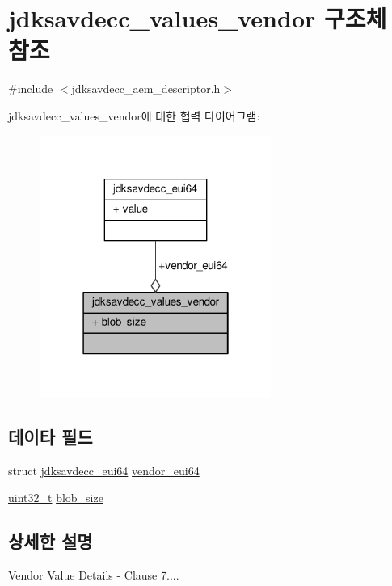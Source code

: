 \hypertarget{structjdksavdecc__values__vendor}{}\section{jdksavdecc\+\_\+values\+\_\+vendor 구조체 참조}
\label{structjdksavdecc__values__vendor}


{\ttfamily \#include $<$jdksavdecc\+\_\+aem\+\_\+descriptor.\+h$>$}



jdksavdecc\+\_\+values\+\_\+vendor에 대한 협력 다이어그램\+:
\nopagebreak
\begin{figure}[H]
\begin{center}
\leavevmode
\includegraphics[width=214pt]{structjdksavdecc__values__vendor__coll__graph}
\end{center}
\end{figure}
\subsection*{데이타 필드}
\begin{DoxyCompactItemize}
\item 
struct \hyperlink{structjdksavdecc__eui64}{jdksavdecc\+\_\+eui64} \hyperlink{structjdksavdecc__values__vendor_a6183c85748a8af0003d293d653c4ae9b}{vendor\+\_\+eui64}
\item 
\hyperlink{parse_8c_a6eb1e68cc391dd753bc8ce896dbb8315}{uint32\+\_\+t} \hyperlink{structjdksavdecc__values__vendor_a32143551b70893faef60f6e35f88ed50}{blob\+\_\+size}
\end{DoxyCompactItemize}


\subsection{상세한 설명}
Vendor Value Details -\/ Clause 7.... 


